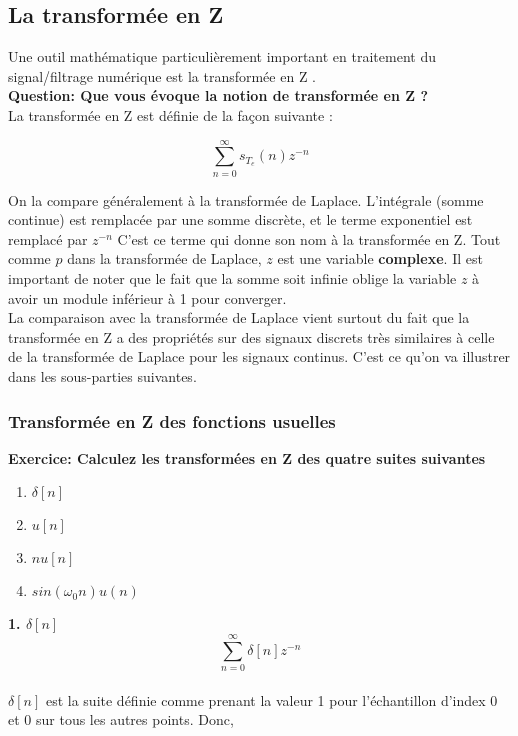 \documentclass[11pt,a4paper]{article}
\begin{document}
\subsection{La transformée en Z}
Une outil mathématique particulièrement important en traitement du signal/filtrage numérique est la transformée en Z .\\

\textbf{Question: Que vous évoque la notion de transformée en Z ?}\\

La transformée en Z est définie de la façon suivante :

\[\sum_{n = 0}^{\infty} s_{T_e}(n) z^{-n}\] 

On la compare généralement à la transformée de Laplace. L'intégrale (somme continue) est remplacée par une somme discrète, et le terme exponentiel est remplacé par $z^{-n}$ C'est ce terme qui donne son nom à la transformée en Z. Tout comme $p$ dans la transformée de Laplace, $z$  est une variable \textbf{complexe}. Il est important de noter que le fait que la somme soit infinie oblige la variable $z$ à avoir un module inférieur à 1 pour converger.\\

La comparaison avec la transformée de Laplace vient surtout du fait que la transformée en Z a des propriétés sur des signaux discrets très similaires à celle de la transformée de Laplace pour les signaux continus. C'est ce qu'on va illustrer dans les sous-parties suivantes.\\

\subsubsection{Transformée en Z des fonctions usuelles}

\textbf{Exercice: Calculez les transformées en Z des quatre suites suivantes}
\begin{enumerate}
\item $\delta[n]$
\item $u[n]$
\item $nu[n]$
\item $sin(\omega_0 n)u(n)$
\end{enumerate} 

\textbf{1. $\delta[n]$}
\[\sum_{n = 0}^{\infty} \delta[n] z^{-n}\] \\

$\delta[n]$ est la suite définie comme prenant la valeur 1 pour l'échantillon d'index 0 et 0 sur tous les autres points. Donc,\\
\end{document}
